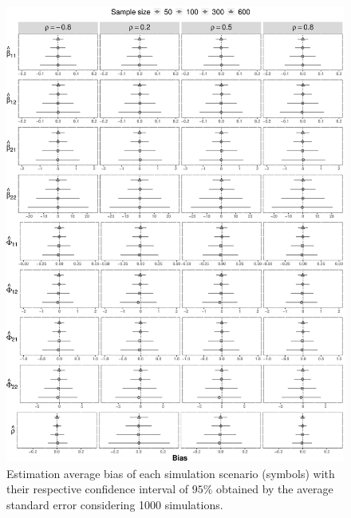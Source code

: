 \documentclass[useAMS,referee]{biom}
\begin{document}
\begin{figure}[h]
\centering
\includegraphics[width=1.1\textwidth]{Figure_2}
\caption{Estimation average bias of each simulation scenario (symbols) with their respective confidence interval of $95\%$ obtained by the average standard error considering 1000 simulations.}
\label{fig1.3}
\end{figure}
\end{document}
